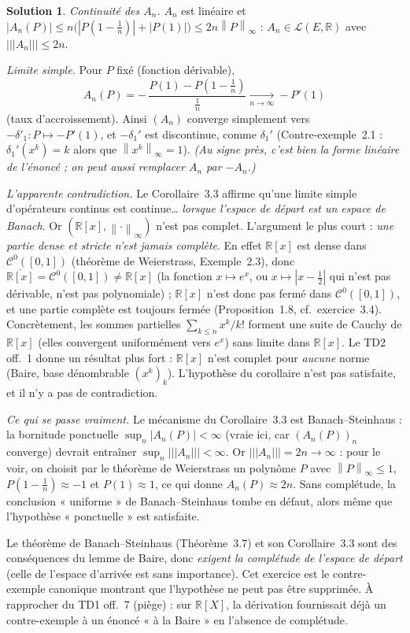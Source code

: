 \documentclass[11pt,a4paper]{article}
\newcommand{\R}{\mathbb{R}}
\newcommand{\adh}[1]{\overline{#1}}
\newcommand{\norm}[1]{\left\|#1\right\|}
\newcommand{\opnorm}[1]{|\!|\!|#1|\!|\!|}
\newcommand{\Lc}{\mathcal{L}}
\newcommand{\Cz}{\mathcal{C}^0}
\theoremstyle{definition}
\newtheorem*{solution}{Solution}
\begin{document}
\begin{solution}
\emph{Continuité des $A_n$.} $A_n$ est linéaire et $|A_n(P)|\le n\big(|P(1-\tfrac1n)|+|P(1)|\big)\le2n\norm P_\infty$ : $A_n\in\Lc(E,\R)$ avec $\opnorm{A_n}\le2n$.

\emph{Limite simple.} Pour $P$ fixé (fonction dérivable),
\[
A_n(P)=-\,\frac{P(1)-P(1-\frac1n)}{\frac1n}\xrightarrow[n\to\infty]{}-P'(1)
\]
(taux d'accroissement). Ainsi $(A_n)$ converge simplement vers $-\delta'_1:P\mapsto-P'(1)$, et $-\delta_1'$ est discontinue, comme $\delta_1'$ (Contre-exemple~2.1 : $\delta_1'(x^k)=k$ alors que $\norm{x^k}_\infty=1$). \emph{(Au signe près, c'est bien la forme linéaire de l'énoncé ; on peut aussi remplacer $A_n$ par $-A_n$.)}

\emph{L'apparente contradiction.} Le Corollaire~3.3 affirme qu'une limite simple d'opérateurs continus est continue… \emph{lorsque l'espace de départ est un espace de Banach}. Or $(\R[x],\norm\cdot_\infty)$ n'est pas complet. L'argument le plus court : \emph{une partie dense et stricte n'est jamais complète}. En effet $\R[x]$ est dense dans $\Cz([0,1])$ (théorème de Weierstrass, Exemple~2.3), donc $\adh{\R[x]}=\Cz([0,1])\ne\R[x]$ (la fonction $x\mapsto e^x$, ou $x\mapsto|x-\tfrac12|$ qui n'est pas dérivable, n'est pas polynomiale) ; $\R[x]$ n'est donc pas fermé dans $\Cz([0,1])$, et une partie complète est toujours fermée (Proposition~1.8, cf.\ exercice~3.4). Concrètement, les sommes partielles $\sum_{k\le n}x^k/k!$ forment une suite de Cauchy de $\R[x]$ (elles convergent uniformément vers $e^x$) sans limite dans $\R[x]$. Le TD2 off.~1 donne un résultat plus fort : $\R[x]$ n'est complet pour \emph{aucune} norme (Baire, base dénombrable $(x^k)_k$). L'hypothèse du corollaire n'est pas satisfaite, et il n'y a pas de contradiction.

\emph{Ce qui se passe vraiment.} Le mécanisme du Corollaire~3.3 est Banach--Steinhaus : la bornitude ponctuelle $\sup_n|A_n(P)|<\infty$ (vraie ici, car $(A_n(P))_n$ converge) devrait entraîner $\sup_n\opnorm{A_n}<\infty$. Or $\opnorm{A_n}=2n\to\infty$ : pour le voir, on choisit par le théorème de Weierstrass un polynôme $P$ avec $\norm P_\infty\le1$, $P(1-\tfrac1n)\approx-1$ et $P(1)\approx1$, ce qui donne $A_n(P)\approx2n$. Sans complétude, la conclusion « uniforme » de Banach--Steinhaus tombe en défaut, alors même que l'hypothèse « ponctuelle » est satisfaite.
\end{solution}

\begin{piege}
Le théorème de Banach--Steinhaus (Théorème~3.7) et son Corollaire~3.3 sont des conséquences du lemme de Baire, donc \emph{exigent la complétude de l'espace de départ} (celle de l'espace d'arrivée est sans importance). Cet exercice est le contre-exemple canonique montrant que l'hypothèse ne peut pas être supprimée. À rapprocher du TD1 off.~7 (piège) : sur $\R[X]$, la dérivation fournissait déjà un contre-exemple à un énoncé « à la Baire » en l'absence de complétude.
\end{piege}
\end{document}
